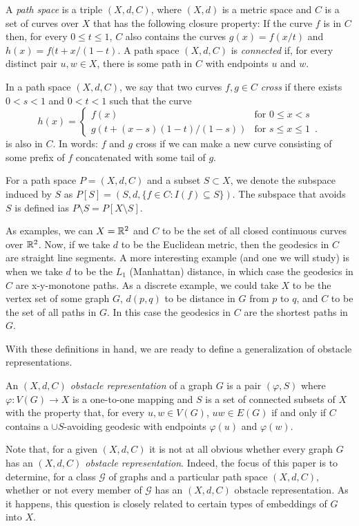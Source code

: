 \documentclass{patmorin}
\begin{document}
A \emph{path space} is a triple $(X,d,C)$, where $(X,d)$ is a metric
space and $C$ is a set of curves over $X$ that has the following closure
property:  If the curve $f$ is in $C$ then, for every $0\le t\le 1$,
$C$ also contains the curves $g(x)=f(x/t)$ and $h(x)=f(t+x/(1-t)$.
A path space $(X,d,C)$ is \emph{connected} if, for every distinct pair
$u,w\in X$, there is some path in $C$ with endpoints $u$ and $w$.

In a path space $(X,d,C)$, we say that
two curves $f,g\in C$ \emph{cross} if there exists $0<s<1$ and $0<t<1$ such
that the curve
\[
    h(x) = \begin{cases} 
             f(x) & \text{for $0\le x< s$} \\
             g(t+(x-s)(1-t)/(1-s)) & \text{for $s\le x\le 1$} \enspace .
           \end{cases}
\]
is also in $C$. In words: $f$ and $g$ cross if we can make a new curve
consisting of some prefix of $f$ concatenated with some tail of $g$.


For a path space $P=(X,d,C)$ and a subset $S\subset X$, we denote the
subspace induced by $S$ as $P[S]=(S,d,\{f\in C:I(f)\subseteq S\})$.  The
subspace that avoids $S$ is defined ias $P\setminus S = P[X\setminus S]$.

As examples, we can $X=\mathbb{R}^2$ and $C$ to be the set of all closed
continuous curves over $\mathbb{R}^2$.  Now, if we take $d$ to be the Euclidean
metric, then the geodesics in $C$ are straight line segments.  A more
interesting example (and one we will study) is when we take $d$ to be
the $L_1$ (Manhattan) distance, in which case the geodesics in $C$ are
x-y-monotone paths.  As a discrete example, we could take $X$ to be the
vertex set of some graph $G$, $d(p,q)$ to be distance in $G$ from $p$
to $q$, and $C$ to be the set of all paths in $G$. In this case the
geodesics in $C$ are the shortest paths in $G$.

With these definitions in hand, we are ready to define a generalization
of obstacle representations.

\begin{defn}
An \emph{$(X,d,C)$ obstacle representation} of a graph $G$ is a pair
$(\varphi, S)$ where $\varphi:V(G)\to X$ is a one-to-one mapping and
$S$ is a set of connected subsets of $X$ with the property that, for
every $u,w\in V(G)$, $uw\in E(G)$ if and only if $C$ contains a $\cup
S$-avoiding geodesic with endpoints $\varphi(u)$ and $\varphi(w)$.
\end{defn}

Note that, for a given $(X,d,C)$ it is not at all obvious whether every
graph $G$ has an \emph{$(X,d,C)$ obstacle representation}.  Indeed,
the focus of this paper is to determine, for a class $\mathcal{G}$ of
graphs and a particular path space $(X,d,C)$, whether or not every
member of $\mathcal{G}$ has an $(X,d,C)$ obstacle representation.
As it happens, this question is closely related to certain types of
embeddings of $G$ into $X$.
\end{document}
